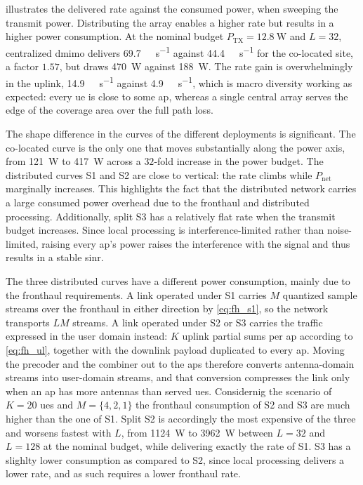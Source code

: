 illustrates the delivered rate against the consumed power, when sweeping the transmit power. Distributing the array enables a higher rate but results in a higher power consumption. At the nominal budget $P_{\mathrm{TX}}=\SI{12.8}{\watt}$ and $L=32$, centralized
\gls{dmimo} delivers \SI{69.7}{\giga\bit\per\second} against
\SI{44.4}{\giga\bit\per\second} for the co-located site, a factor $1.57$, but
draws \SI{470}{\watt} against \SI{188}{\watt}. The rate gain is overwhelmingly
in the uplink, \SI{14.9}{\giga\bit\per\second} against
\SI{4.9}{\giga\bit\per\second}, which is macro diversity working as expected:
every \gls{ue} is close to some \gls{ap}, whereas a single central array serves
the edge of the coverage area over the full path loss. 

The shape difference in the curves of the different deployments is significant. The co-located curve
is the only one that moves substantially along the power axis, from
\SI{121}{\watt} to \SI{417}{\watt} across a $32$-fold increase in the power budget. The distributed curves S1 and S2 are close to vertical: the rate climbs while $P_{\mathrm{net}}$ marginally increases. This highlights the fact that the distributed network carries a large consumed power overhead due to the fronthaul and distributed processing. Additionally, split S3 has a relatively flat rate when the transmit budget increases. Since local processing is interference-limited rather than noise-limited, raising every \gls{ap}'s power raises the interference with the signal and thus results in a stable \gls{sinr}. 

The three distributed curves have a different power consumption, mainly due to the fronthaul requirements. A link
operated under S1 carries $M$ quantized sample streams over the fronthaul in either direction by
\eqref{eq:fh_s1}, so the network transports $LM$ streams. A link operated under S2 or S3 carries the
traffic expressed in the user domain instead: $K$ uplink partial sums per
\gls{ap} according to \eqref{eq:fh_ul}, together with the downlink
payload duplicated to every \gls{ap}. Moving the precoder and the combiner out
to the \glspl{ap} therefore converts antenna-domain streams into user-domain
streams, and that conversion compresses the link only when an \gls{ap} has more
antennas than served \glspl{ue}. Considernig the scenario of $K=20$ \glspl{ue} and $M=\{4, 2, 1\}$ the fronthaul consumption of S2 and S3 are much higher than the one of S1. Split S2 is accordingly the most expensive of the three and worsens fastest with $L$, from \SI{1124}{\watt} to \SI{3962}{\watt} between $L=32$ and $L=128$ at the
nominal budget, while delivering exactly the rate of S1. S3 has a slighlty lower consumption as compared to S2, since local processing delivers a lower rate, and as such requires a lower fronthaul rate. 



